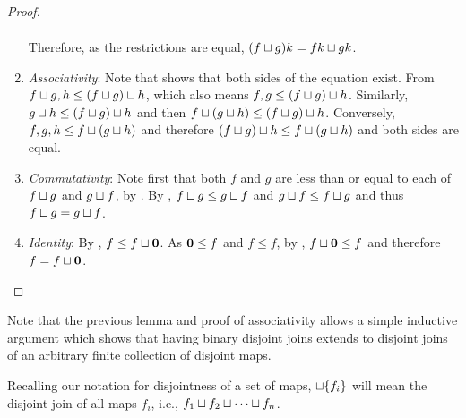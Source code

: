 \begin{proof}
\begin{enumerate}[{(}i{)}]
\begin{align*}
      \end{align*}
      Therefore, as the restrictions are equal, $(f\sqcup g)k = f k \sqcup g k$.
    \item \emph{Associativity}: Note that  shows that both sides of the equation
      exist.
      From  $f\sqcup g, h \le (f\sqcup g)\sqcup h$, which also means
      $f, g \le (f\sqcup g)\sqcup h$. Similarly, $g\sqcup h \le (f\sqcup g)\sqcup h $ and then $f
      \sqcup (g\sqcup h)\le (f\sqcup g)\sqcup h$. Conversely, $f,g,h \le f \sqcup (g\sqcup h)$ and
      therefore $(f\sqcup g)\sqcup h \le f \sqcup (g\sqcup h)$ and both sides are equal.
    \item \emph{Commutativity}: Note first that both $f$ and $g$ are less than or equal to each of
      $f\sqcup g$ and $g \sqcup f$, by . By , $f \sqcup g \le
      g\sqcup f$ and $g\sqcup f \le f \sqcup g$ and thus $f \sqcup g = g \sqcup f$.
    \item \emph{Identity}: By , $f \le f \sqcup \mathbf{0}$. As $\mathbf{0} \le f$ and $f \le
      f$, by , $f \sqcup \mathbf{0} \le f$ and therefore $f = f \sqcup \mathbf{0}$.
  \end{enumerate}
\end{proof}

Note that the previous lemma and proof of associativity allows a simple inductive argument which
shows that having binary disjoint joins extends to disjoint joins of an arbitrary
finite collection of disjoint maps.

Recalling our notation for disjointness of a set of maps,
$\sqcup \{f_i\}$ will mean the disjoint join of all maps $f_i$, i.e.,
$f_1 \sqcup f_2 \sqcup \cdots \sqcup f_n$.

